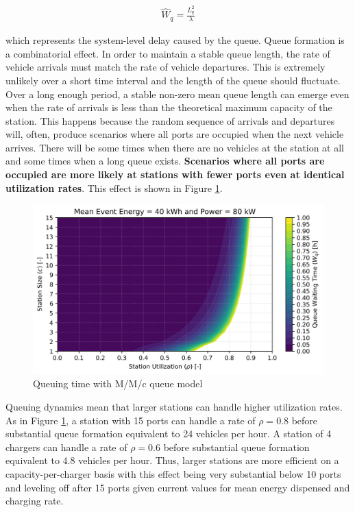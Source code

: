 \begin{gather}
	\hat{W}_q = \frac{L_q^2}{\lambda}
\end{gather}

which represents the system-level delay caused by the queue. Queue formation is a combinatorial effect. In order to maintain a stable queue length, the rate of vehicle arrivals must match the rate of vehicle departures. This is extremely unlikely over a short time interval and the length of the queue should fluctuate. Over a long enough period, a stable non-zero mean queue length can emerge even when the rate of arrivals is less than the theoretical maximum capacity of the station. This happens because the random sequence of arrivals and departures will, often, produce scenarios where all ports are occupied when the next vehicle arrives. There will be some times when there are no vehicles at the station at all and some times when a long queue exists. \textbf{Scenarios where all ports are occupied are more likely at stations with fewer ports even at identical utilization rates}. This effect is shown in Figure \ref{fig:queue}.

\begin{figure}[H]
	\centering
	\includegraphics[width = \figurewidth]{./figures/formulation/queue.png}
	\caption{Queuing time with M/M/c queue model}
	\label{fig:queue}
\end{figure}

Queuing dynamics mean that larger stations can handle higher utilization rates. As in Figure \ref{fig:queue}, a station with 15 ports can handle a rate of $\rho = 0.8$ before substantial queue formation equivalent to 24 vehicles per hour. A station of 4 chargers can handle a rate of $\rho = 0.6$ before substantial queue formation equivalent to 4.8 vehicles per hour. Thus, larger stations are more efficient on a capacity-per-charger basis with this effect being very substantial below 10 ports and leveling off after 15 ports given current values for mean energy dispensed and charging rate.

